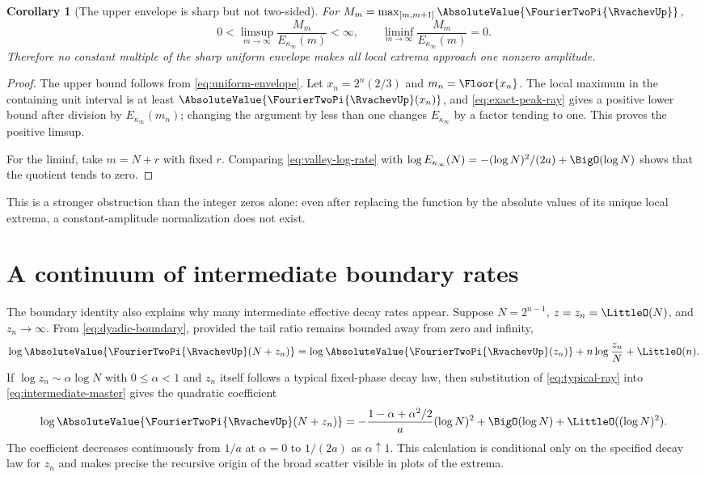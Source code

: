 \documentclass[11pt,oneside]{article}
\numberwithin{equation}{section}
\newtheorem{corollary}[theorem]{Corollary}
\theoremstyle{definition}
\theoremstyle{remark}
\begin{document}
\begin{corollary}[The upper envelope is sharp but not two-sided]
\label{cor:extrema-limsup-liminf}
For $M_m=\max_{[m,m+1]}\AbsoluteValue{\FourierTwoPi{\RvachevUp}}$,
\begin{equation}
 0<\limsup_{m\to\infty}\frac{M_m}{E_{\kappa_\infty}(m)}<\infty,
 \qquad
 \liminf_{m\to\infty}\frac{M_m}{E_{\kappa_\infty}(m)}=0.
 \label{eq:extrema-limsup-liminf}
\end{equation}
Therefore no constant multiple of the sharp uniform envelope makes all local extrema
approach one nonzero amplitude.
\end{corollary}

\begin{proof}
The upper bound follows from \eqref{eq:uniform-envelope}.  Let
$x_n=2^n(2/3)$ and $m_n=\Floor{x_n}$.  The local maximum in the containing unit interval is
at least $\AbsoluteValue{\FourierTwoPi{\RvachevUp}(x_n)}$, and \eqref{eq:exact-peak-ray} gives a positive lower bound
after division by $E_{\kappa_\infty}(m_n)$; changing the argument by less than one changes
$E_{\kappa_\infty}$ by a factor tending to one.  This proves the positive limsup.

For the liminf, take $m=N+r$ with fixed $r$.  Comparing
\eqref{eq:valley-log-rate} with
$\log E_{\kappa_\infty}(N)=-(\log N)^2/(2a)+\BigO(\log N)$ shows that the quotient tends to
zero.
\end{proof}

This is a stronger obstruction than the integer zeros alone: even after replacing the
function by the absolute values of its unique local extrema, a constant-amplitude
normalization does not exist.

\section{A continuum of intermediate boundary rates}
\label{sec:intermediate-rates}

The boundary identity also explains why many intermediate effective decay rates appear.
Suppose $N=2^{n-1}$, $z=z_n=\LittleO(N)$, and $z_n\to\infty$.  From
\eqref{eq:dyadic-boundary}, provided the tail ratio remains bounded away from zero and
infinity,
\begin{equation}
 \log\AbsoluteValue{\FourierTwoPi{\RvachevUp}(N+z_n)}
 =\log\AbsoluteValue{\FourierTwoPi{\RvachevUp}(z_n)}+n\log\frac{z_n}{N}+\LittleO(n).
 \label{eq:intermediate-master}
\end{equation}
If $\log z_n\sim\alpha\log N$ with $0\le\alpha<1$ and $z_n$ itself follows a typical
fixed-phase decay law, then substitution of \eqref{eq:typical-ray} into
\eqref{eq:intermediate-master} gives the quadratic coefficient
\begin{equation}
 \log\AbsoluteValue{\FourierTwoPi{\RvachevUp}(N+z_n)}
 =-\frac{1-\alpha+\alpha^2/2}{a}(\log N)^2
  +\BigO(\log N)+\LittleO((\log N)^2).
 \label{eq:intermediate-quadratic}
\end{equation}
The coefficient decreases continuously from $1/a$ at $\alpha=0$ to $1/(2a)$ as
$\alpha\uparrow1$.  This calculation is conditional only on the specified decay law for
$z_n$ and makes precise the recursive origin of the broad scatter visible in plots of the
extrema.
\end{document}
